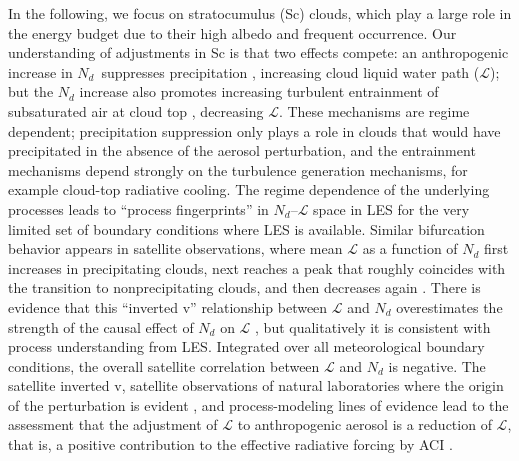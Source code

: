 \documentclass[acp, manuscript]{copernicus}\usepackage[]{graphicx}\usepackage[]{xcolor}
\newcommand\nd{\ensuremath{N_d}}
\newcommand\lwp{\ensuremath{\mathcal L}}
\begin{document}
In the following, we focus on stratocumulus (Sc) clouds, which play a large role
in the energy budget due to their high albedo and frequent occurrence.  Our
understanding of adjustments in Sc is that two effects compete: an anthropogenic
increase in \nd\ suppresses precipitation \citep{Albrecht1989}, increasing
cloud liquid water path (\lwp); but the \nd{} increase also promotes increasing turbulent entrainment of subsaturated air
at cloud top \citep{Ackerman2004,Bretherton2007}, decreasing \lwp.  These
mechanisms are regime dependent; precipitation suppression only plays a role in
clouds that would have precipitated in the absence of the aerosol perturbation,
and the entrainment mechanisms depend strongly on the turbulence generation
mechanisms, for example cloud-top radiative cooling.  The regime dependence of the
underlying processes leads to ``process fingerprints'' in \nd--\lwp{} space in
LES \citep{Hoffmann2020} for the very limited set of boundary conditions where
LES is available.  Similar bifurcation behavior appears in satellite
observations, where mean \lwp{} as a function of \nd{} first increases in
precipitating clouds, next reaches a peak that roughly coincides with the transition
to nonprecipitating clouds, and then decreases again \citep{Gryspeerdt2019}.
There is evidence that this ``inverted v'' relationship between \lwp{} and \nd{}
overestimates the strength of the causal effect of \nd{} on \lwp{}
\citep{Gryspeerdt2019,Arola2022,Fons2023}, but qualitatively it is consistent
with
process understanding from LES.  Integrated over all meteorological boundary
conditions, the overall satellite correlation between \lwp{} and \nd{} is
negative.  The
satellite inverted v, satellite observations of natural laboratories
\citep{Christensen2022} where the 
origin of the perturbation is evident \citep{Malavelle2017,Toll2019}, and
process-modeling lines of evidence lead to the assessment that the adjustment of
\lwp{} to anthropogenic aerosol is a reduction of \lwp{}, that is, a positive
contribution to the effective radiative forcing by ACI
\citep[ERFaci;][]{Bellouin2020,Forster2021}. 
\end{document}

